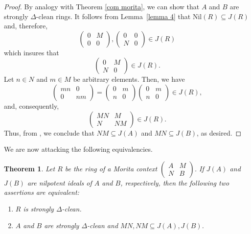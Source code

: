 \documentclass[12pt]{amsart}
\newtheorem{theorem}{Theorem}[section]
\theoremstyle{definition}
\begin{document}
\begin{proof}
By analogy with Theorem \ref{com morita}, we can show that $A$ and $B$ are strongly $\Delta$-clean rings. It follows from Lemma~\ref{lemma 4} that $\text{Nil}(R) \subseteq J(R)$ and, therefore,
\[
\begin{pmatrix}
0 & M \\
0 & 0
\end{pmatrix},
\begin{pmatrix}
0 & 0 \\
N & 0
\end{pmatrix} \in J(R)
\]
which insures that
\[
\begin{pmatrix}
0 & M \\
N & 0
\end{pmatrix} \in J(R).
\]
Let $n \in N$ and $m \in M$ be arbitrary elements. Then, we have
\[
\begin{pmatrix}
mn & 0 \\
0 & nm
\end{pmatrix} =
\begin{pmatrix}
0 & m \\
n & 0
\end{pmatrix}
\begin{pmatrix}
0 & m \\
n & 0
\end{pmatrix} \in J(R),
\]
and, consequently,
\[
\begin{pmatrix}
MN & M \\
N & NM
\end{pmatrix} \in J(R).
\]
Thus, from \cite[Theorem 1]{rmor}, we conclude that $NM \subseteq J(A)$ and $MN \subseteq J(B)$, as desired.
\end{proof}

We are now attacking the following equivalencies.

\begin{theorem}\label{eq mori}
Let $R$ be the ring of a Morita context $\begin{pmatrix}
A & M\\
N & B
\end{pmatrix}$. If $J(A)$ and $J(B)$ are nilpotent ideals of $A$ and $B$, respectively, then
the following two assertions are equivalent:
\begin{enumerate}
    \item[(1)] $R$ is strongly $\Delta$-clean.
    \item[(2)] $A$ and $B$ are strongly $\Delta$-clean and $MN, NM \subseteq J(A), J(B)$.
\end{enumerate}
\end{theorem}
\end{document}
